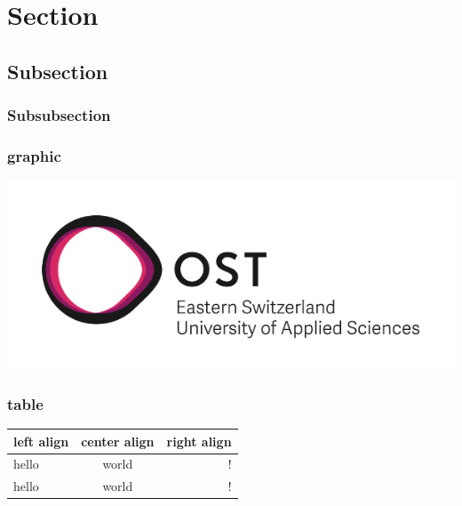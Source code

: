 

\section{Section}



\subsection{Subsection}


\subsubsection{Subsubsection}
\lipsum

\subsubsection{graphic}
\begin{center}
    \includegraphics[width=\linewidth]{./media/OST_Logo.png}
\end{center}
\vspace{-8pt}

\subsubsection{table}
    \begin{center}
    \begin{tabular}{l | c | r}
        \hline
        left align & center align & right align\\ \hline
        \hline
        hello & world & !\\ \hline
        hello & world & !\\ \hline
    \end{tabular}
    \end{center}

